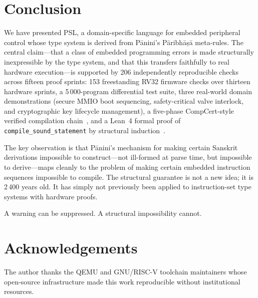 \documentclass[11pt,a4paper]{article}
\begin{document}
\section{Conclusion}
\label{sec:conclusion}

We have presented PSL, a domain-specific language for embedded peripheral
control whose type system is derived from P\={a}nini's P\={a}ribh\={a}\d{s}\={a}
meta-rules. The central claim---that a class of embedded programming errors is
made structurally inexpressible by the type system, and that this transfers
faithfully to real hardware execution---is supported by 206 independently
reproducible checks across fifteen proof sprints: 153 freestanding RV32
firmware checks over thirteen hardware sprints, a 5\,000-program differential
test suite, three real-world domain demonstrations (secure MMIO boot
sequencing, safety-critical valve interlock, and cryptographic key lifecycle
management), a five-phase CompCert-style verified compilation
chain~\cite{leroy2009compcert}, and a Lean~4 formal proof of
\texttt{compile\_sound\_statement} by structural induction~\cite{moura2021lean4}.

The key observation is that P\={a}nini's mechanism for making certain Sanskrit
derivations impossible to construct---not ill-formed at parse time, but
impossible to derive---maps cleanly to the problem of making certain embedded
instruction sequences impossible to compile. The structural guarantee is not a
new idea; it is 2\,400 years old. It has simply not previously been applied to
instruction-set type systems with hardware proofs.

A warning can be suppressed. A structural impossibility cannot.

\section*{Acknowledgements}
The author thanks the QEMU and GNU/RISC-V toolchain maintainers whose
open-source infrastructure made this work reproducible without institutional
resources.



\end{document}
